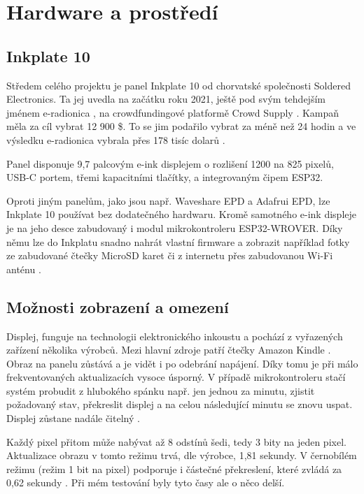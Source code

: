 \chapter{Hardware a prostředí}

\section{Inkplate 10}
Středem celého projektu je panel Inkplate 10 od chorvatské společnosti Soldered Electronics. Ta jej uvedla na začátku roku 2021, ještě pod svým tehdejším jménem e-radionica \cite{solderedelectronicsUs}, na crowdfundingové platformě Crowd Supply \cite{zovkoOurCampaignLive2021}.
Kampaň měla za cíl vybrat 12 900 \$. To se jim podařilo vybrat za méně než 24 hodin \cite{crowdsupplyna[@crowd_supply]NewCampaignLaunched2021} a ve výsledku e-radionica vybrala přes 178 tisíc dolarů \cite{solderedelectronicsInkplate102021}.

Panel disponuje 9,7 palcovým e-ink displejem o rozlišení 1200 na 825 pixelů, USB-C portem, třemi kapacitními tlačítky, a integrovaným čipem ESP32.

Oproti jiným panelům, jako jsou např. Waveshare EPD a Adafrui EPD, lze Inkplate 10 používat bez dodatečného hardwaru. Kromě samotného e-ink displeje je na jeho desce zabudovaný i modul mikrokontroleru ESP32-WROVER. Díky němu lze do Inkplatu snadno nahrát vlastní firmware a zobrazit například fotky ze zabudované čtečky MicroSD karet či z internetu přes zabudovanou Wi-Fi anténu \cite{solderedelectronicsInkplate102021}.

\section{Možnosti zobrazení a omezení}

Displej, funguje na technologii elektronického inkoustu a pochází z vyřazených zařízení několika výrobců. Mezi hlavní zdroje patří čtečky Amazon Kindle \cite{solderedelectronicsInkplate102021}. Obraz na panelu zůstává a je vidět i po odebrání napájení. Díky tomu je při málo frekventovaných aktualizacích vysoce úsporný. V případě mikrokontroleru stačí systém probudit z hlubokého spánku např. jen jednou za minutu, zjistit požadovaný stav, překreslit displej a na celou následující minutu se znovu uspat. Displej zůstane nadále čitelný \cite{heikenfeldReviewPaperCritical2011}.

Každý pixel přitom může nabývat až 8 odstínů šedi, tedy 3 bity na jeden pixel. Aktualizace obrazu v tomto režimu trvá, dle výrobce, 1,81 sekundy.
V černobílém režimu (režim 1 bit na pixel) podporuje i částečné překreslení, které zvládá za 0,62 sekundy \cite{solderedelectronicsInkplate102021}. Při mém testování byly tyto časy ale o něco delší.


